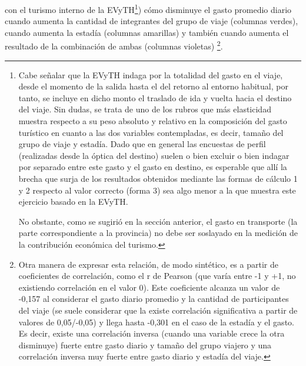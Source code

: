 \documentclass[
]{book}
\begin{document}
con el turismo interno de la EVyTH\footnote{Cabe señalar que la EVyTH indaga por la totalidad del gasto en el viaje, desde el momento de la salida hasta el del retorno al entorno habitual, por tanto, se incluye en dicho monto el traslado de ida y vuelta hacia el destino del viaje. Sin dudas, se trata de uno de los rubros que más elasticidad muestra respecto a su peso absoluto y relativo en la composición del gasto turístico en cuanto a las dos variables contempladas, es decir, tamaño del grupo de viaje y estadía. Dado que en general las encuestas de perfil (realizadas desde la óptica del destino) suelen o bien excluir o bien indagar por separado entre este gasto y el gasto en destino, es esperable que allí la brecha que surja de los resultados obtenidos mediante las formas de cálculo 1 y 2 respecto al valor correcto (forma 3) sea algo menor a la que muestra este ejercicio basado en la EVyTH.

  No obstante, como se sugirió en la sección anterior, el gasto en transporte (la parte correspondiente a la provincia) no debe ser soslayado en la medición de la contribución económica del turismo.}) cómo disminuye el gasto promedio diario cuando aumenta la cantidad de integrantes del grupo de viaje (columnas verdes), cuando aumenta la estadía (columnas amarillas) y también cuando aumenta el resultado de la combinación de ambas (columnas violetas) \footnote{Otra manera de expresar esta relación, de modo sintético, es a partir de coeficientes de correlación, como el r de Pearson (que varía entre -1 y +1, no existiendo correlación en el valor 0). Este coeficiente alcanza un valor de -0,157 al considerar el gasto diario promedio y la cantidad de participantes del viaje (se suele considerar que la existe correlación significativa a partir de valores de 0,05/-0,05) y llega hasta -0,301 en el caso de la estadía y el gasto. Es decir, existe una correlación inversa (cuando una variable crece la otra disminuye) fuerte entre gasto diario y tamaño del grupo viajero y una correlación inversa muy fuerte entre gasto diario y estadía del viaje.}.
\end{document}
